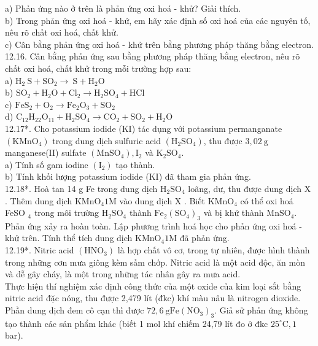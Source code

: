 \documentclass[10pt]{article}
\begin{document}
a) Phản ứng nào ở trên là phản ứng oxi hoá - khử? Giải thích.\\
b) Trong phản ứng oxi hoá - khử, em hãy xác định số oxi hoá của các nguyên tố, nêu rõ chất oxi hoá, chất khử.\\
c) Cân bằng phản ứng oxi hoá - khử trên bằng phương pháp thăng bằng electron.\\
12.16. Cân bằng phản ứng sau bằng phương pháp thăng bằng electron, nêu rõ chất oxi hoá, chất khử trong mỗi trường hợp sau:\\
a) $\mathrm{H}_{2} \mathrm{~S}+\mathrm{SO}_{2} \rightarrow \mathrm{~S}+\mathrm{H}_{2} \mathrm{O}$\\
b) $\mathrm{SO}_{2}+\mathrm{H}_{2} \mathrm{O}+\mathrm{Cl}_{2} \rightarrow \mathrm{H}_{2} \mathrm{SO}_{4}+\mathrm{HCl}$\\
c) $\mathrm{FeS}_{2}+\mathrm{O}_{2} \rightarrow \mathrm{Fe}_{2} \mathrm{O}_{3}+\mathrm{SO}_{2}$\\
d) $\mathrm{C}_{12} \mathrm{H}_{22} \mathrm{O}_{11}+\mathrm{H}_{2} \mathrm{SO}_{4} \rightarrow \mathrm{CO}_{2}+\mathrm{SO}_{2}+\mathrm{H}_{2} \mathrm{O}$\\
12.17*. Cho potassium iodide (KI) tác dụng với potassium permanganate $\left(\mathrm{KMnO}_{4}\right)$ trong dung dịch sulfuric acid $\left(\mathrm{H}_{2} \mathrm{SO}_{4}\right)$, thu được $3,02 \mathrm{~g}$ manganese(II) sulfate $\left(\mathrm{MnSO}_{4}\right), \mathrm{I}_{2}$ và $\mathrm{K}_{2} \mathrm{SO}_{4}$.\\
a) Tính số gam iodine $\left(\mathrm{I}_{2}\right)$ tạo thành.\\
b) Tính khối lượng potassium iodide (KI) đã tham gia phản ứng.\\
12.18*. Hoà tan 14 g Fe trong dung dịch $\mathrm{H}_{2} \mathrm{SO}_{4}$ loãng, dư, thu được dung dịch X . Thêm dung dịch $\mathrm{KMnO}_{4} 1 \mathrm{M}$ vào dung dịch X . Biết $\mathrm{KMnO}_{4}$ có thể oxi hoá FeSO ${ }_{4}$ trong môi trường $\mathrm{H}_{2} \mathrm{SO}_{4}$ thành $\mathrm{Fe}_{2}\left(\mathrm{SO}_{4}\right)_{3}$ và bị khử thành $\mathrm{MnSO}_{4}$. Phản ứng xảy ra hoàn toàn. Lập phương trình hoá học cho phản ứng oxi hoá - khử trên. Tính thể tích dung dịch $\mathrm{KMnO}_{4} 1 \mathrm{M}$ đã phản ứng.\\
12.19*. Nitric acid $\left(\mathrm{HNO}_{3}\right)$ là hợp chất vô cơ, trong tự nhiên, được hình thành trong những cơn mưa giông kèm sấm chớp. Nitric acid là một acid độc, ăn mòn và dễ gây cháy, là một trong những tác nhân gây ra mưa acid.\\
Thực hiện thí nghiệm xác định công thức của một oxide của kim loại sắt bằng nitric acid đặc nóng, thu được 2,479 lít (đkc) khí màu nâu là nitrogen dioxide. Phần dung dịch đem cô cạn thì được $72,6 \mathrm{~g} \mathrm{Fe}\left(\mathrm{NO}_{3}\right)_{3}$. Giả sử phản ứng không tạo thành các sản phẩm khác (biết 1 mol khí chiếm 24,79 lít đo ở đkc $25^{\circ} \mathrm{C}, 1$ bar).\\
\end{document}
